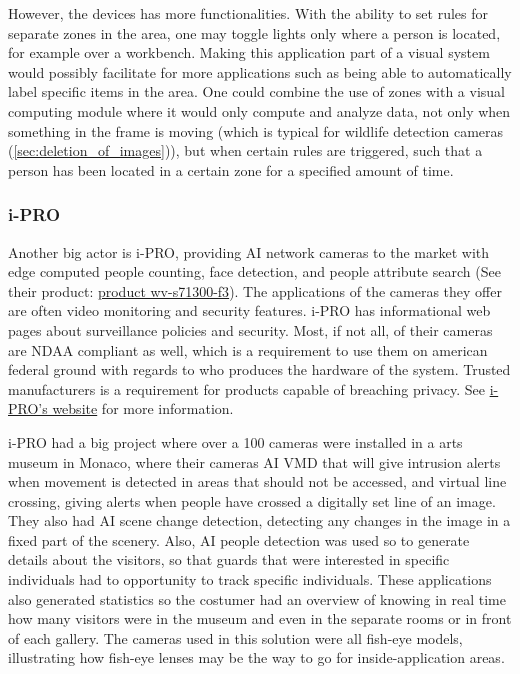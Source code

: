 However, the devices has more functionalities. With the ability to set rules for separate zones in the area, one may toggle lights only where a person is located, for example over a workbench. Making this application part of a visual system would possibly facilitate for more applications such as being able to automatically label specific items in the area. One could combine the use of zones with a visual computing module where it would only compute and analyze data, not only when something in the frame is moving (which is typical for wildlife detection cameras (\ref{sec:deletion_of_images})), but when certain rules are triggered, such that a person has been located in a certain zone for a specified amount of time.

\subsubsection{i-PRO}
Another big actor is i-PRO, providing AI network cameras to the market with edge computed people counting, face detection, and people attribute search
(See their product: \href{https://i-pro.com/products_and_solutions/en/surveillance/products/wv-s71300-f3}{product wv-s71300-f3}). The applications of the cameras they offer are often video monitoring and security features. i-PRO has informational web pages about surveillance policies and security. Most, if not all, of their cameras are NDAA compliant as well, which is a requirement to use them on american federal ground with regards to who produces the hardware of the system. Trusted manufacturers is a requirement for products capable of breaching privacy. See \href{https://i-pro.com/}{i-PRO's website} for more information.

i-PRO had a big project where over a 100 cameras were installed in a arts museum in Monaco, where their cameras AI VMD that will give intrusion alerts when movement is detected in areas that should not be accessed, and virtual line crossing, giving alerts when people have crossed a digitally set line of an image. They also had AI scene change detection, detecting any changes in the image in a fixed part of the scenery. Also, AI people detection was used so to generate details about the visitors, so that guards that were interested in specific individuals had to opportunity to track specific individuals. These applications also generated statistics so the costumer had an overview of knowing in real time how many visitors were in the museum and even in the separate rooms or in front of each gallery. The cameras used in this solution were all fish-eye models, illustrating how fish-eye lenses may be the way to go for inside-application areas.

